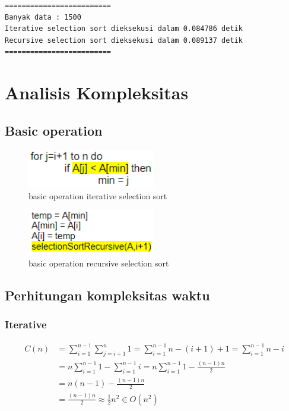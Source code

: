 \documentclass[12pt]{article}
\begin{document}
\newpage

\begin{verbatim}
=========================
Banyak data : 1500
Iterative selection sort dieksekusi dalam 0.084786 detik
Recursive selection sort dieksekusi dalam 0.089137 detik
=========================
\end{verbatim}

\newpage
\section{Analisis Kompleksitas}
\subsection{Basic operation}
\begin{figure}[h!]
    \centering
    \includegraphics[width=0.5\textwidth]{images/iterative.PNG}
    \caption{basic operation iterative selection sort}
\end{figure}
\begin{figure}[h!]
    \centering
    \includegraphics[width=0.5\textwidth]{images/recursive.PNG}
    \caption{basic operation recursive selection sort}
\end{figure}
\subsection{Perhitungan kompleksitas waktu}
\subsubsection{Iterative}
\begin{align}
    C(n) &=\sum_{i=1}^{n-1} \sum_{j=i+1}^{n} 1 = \sum_{i=1}^{n-1} {n-(i+1)+1} =\sum_{i=1}^{n-1} {n-i}
    \nonumber
    \\
    &= n\sum_{i=1}^{n-1} 1 - \sum_{i=1}^{n-1} i = n\sum_{i=1}^{n-1} 1 - \frac{(n-1)n}{2}
    \nonumber
    \\
    &= n(n-1) - \frac{(n-1)n}{2}
    \nonumber
    \\
    &= \frac{(n-1)n}{2} \approx \frac{1}{2}n^2 \in O(n^2)
\end{align}
\end{document}
